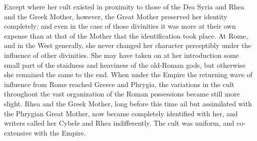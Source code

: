 \documentclass[a4paper, 11pt, oneside, polutonikogreek, english]{article}
\begin{document}
Except where her cult existed in proximity to those of the Dea Syria and Rhea and the Greek Mother, however, the Great Mother preserved her identity completely; and even in the case of those divinities it was more at their own expense than at that of the Mother that the identification took place. At Rome, and in the West generally, she never changed her character perceptibly under the influence of other divinities. She may have taken on at her introduction some small part of the staidness and heaviness of the old-Roman gods, but otherwise she remained the same to the end. When under the Empire the returning wave of influence from Rome reached Greece and Phrygia, the variations in the cult throughout the vast organization of the Roman possessions became still more slight. Rhea and the Greek Mother, long before this time ail but assimilated with the Phrygian Great Mother, now became completely identified with her, and writers called her Cybele and Rhea indifferently. The cult was uniform, and co-extensive with the Empire.
\end{document}
